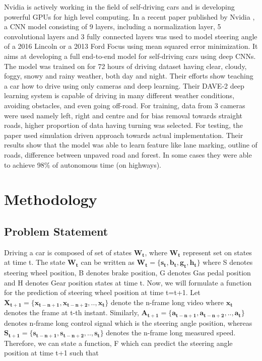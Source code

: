 \documentclass[a4paper,11pt,titlepage,drop]{article}%
\begin{document}
Nvidia is actively working in the field of self-driving cars and is developing powerful GPUs for high level computing. In a recent paper published by Nvidia \cite{nvidia}, a CNN model consisting of 9 layers, including a normalization layer, 5 convolutional layers and 3 fully connected layers was used to model steering angle of a 2016 Lincoln or a 2013 Ford Focus using mean squared error minimization. It aims at developing a full end-to-end model for self-driving cars using deep CNNs. The model was trained on for 72 hours of driving dataset having clear, cloudy, foggy, snowy and rainy weather, both day and night. Their efforts show teaching a car how to drive using only cameras and deep learning. Their DAVE-2 deep learning system is capable of driving in many different weather conditions, avoiding obstacles, and even going off-road. For training, data from 3 cameras were used namely left, right and centre and for bias removal towards straight roads, higher proportion of data having turning was selected. For testing, the paper used simulation driven approach towards actual implementation. Their results show that the model was able to learn feature like lane marking, outline of roads, difference between unpaved road and forest. In some cases they were able to achieve 98\% of autonomous time (on highways).



\section{Methodology}

\subsection{Problem Statement}

Driving a car is composed of set of states $\mathbf{W_t}$, where $\mathbf{W_t}$ represent set on states at time t. The state $\mathbf{W_t}$ can be written as $\mathbf{W_t=\{s_t,b_t,g_t, h_t\}}$ where S denotes steering wheel position, B denotes brake position, G denotes Gas pedal position and H denotes Gear position states at time t. Now, we will formulate a function for the prediction of steering wheel position at time t=t+1. Let $\mathbf{X_{t+1}=\{x_{t-n+1}, x_{t-n+2}, . . , x_t\}}$ denote the n-frame long video where $\mathbf{x_t}$ denotes the frame at t-th instant. Similarly, $\mathbf{A_{t+1}=\{a_{t-n+1}, a_{t-n+2}, . . , a_t\}}$ denotes n-frame long control signal which is the steering angle position, whereas $\mathbf{S_{t+1}=\{s_{t-n+1}, s_{t-n+2}, . . , s_t\}}$ denotes the n-frame long measured speed. Therefore, we can state a function, F which can predict the steering angle position at time t+1 such that \\ 
 
\end{document}
